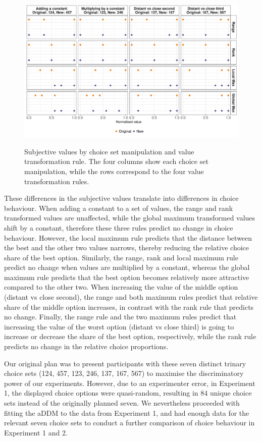 \documentclass[11pt,a4paper]{article}
\begin{document}
\begin{figure}
\captionsetup{justification=centering}
\centering
\caption{Subjective values by choice set manipulation and value transformation rule. The four columns show each choice set manipulation, while the rows correspond to the four value transformation rules.}
\includegraphics[width=1\textwidth]{./explain.pdf}
\label{fig:choicesetmanip}
\end{figure}

These differences in the subjective values translate into differences in choice behaviour. When adding a constant to a set of values, the range and rank transformed values are unaffected, while the global maximum transformed values shift by a constant, therefore these three rules predict no change in choice behaviour. However, the local maximum rule predicts that the distance between the best and the other two values narrows, thereby reducing the relative choice share of the best option. Similarly, the range, rank and local maximum rule predict no change when values are multiplied by a constant, whereas the global maximum rule predicts that the best option becomes relatively more attractive compared to the other two. When increasing the value of the middle option (distant vs close second), the range and both maximum rules predict that relative share of the middle option increases, in contrast with the rank rule that predicts no change. Finally, the range rule and the two maximum rules predict that increasing the value of the worst option (distant vs close third) is going to increase or decrease the share of the best option, respectively, while the rank rule predicts no change in the relative choice proportions.


Our original plan was to present participants with these seven distinct trinary choice sets (124, 457, 123, 246, 137, 167, 567) to maximise the discriminatory power of our experiments. However, due to an experimenter error, in Experiment 1, the displayed choice options were quasi-random, resulting in 84 unique choice sets instead of the originally planned seven. We nevertheless proceeded with fitting the aDDM to the data from Experiment 1, and had enough data for the relevant seven choice sets to conduct a further comparison of choice behaviour in Experiment 1 and 2.
\end{document}
